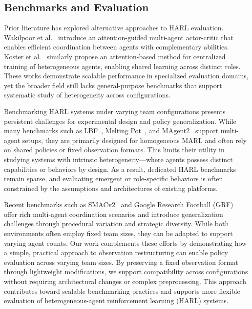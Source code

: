 \documentclass{article}
\begin{document}
\subsection{Benchmarks and Evaluation}

Prior literature has explored alternative approaches to HARL evaluation. 
Wakilpoor et al.~\cite{wakilpoor2020} introduce an attention-guided multi-agent actor-critic 
that enables efficient coordination between agents with complementary abilities. 
Koster et al.~\cite{koster2020} similarly propose an attention-based method for centralized 
training of heterogeneous agents, enabling shared learning across distinct roles. 
These works demonstrate scalable performance in specialized evaluation domains, 
yet the broader field still lacks general-purpose benchmarks that support systematic 
study of heterogeneity across configurations.

Benchmarking HARL systems under varying team configurations presents persistent
challenges for experimental design and policy generalization. While many benchmarks 
such as LBF~\cite{papoudakis2021}, Melting Pot~\cite{leibo2021}, and MAgent2~\cite{zheng2017} 
support multi-agent setups, they are primarily designed for homogeneous MARL 
and often rely on shared policies or fixed observation formats. This limits 
their utility in studying systems with intrinsic heterogeneity—where agents possess 
distinct capabilities or behaviors by design. As a result, dedicated HARL benchmarks 
remain sparse, and evaluating emergent or role-specific behaviors is often constrained 
by the assumptions and architectures of existing platforms.

Recent benchmarks such as SMACv2~\cite{ellis2023} and Google Research Football 
(GRF)~\cite{kurach2020} offer rich multi-agent coordination scenarios and introduce 
generalization challenges through procedural variation and strategic diversity. While both 
environments often employ fixed team sizes, they can be adapted to support varying agent counts.
Our work complements these efforts by demonstrating how a simple, practical approach to 
observation restructuring can enable policy evaluation across varying team sizes. By 
preserving a fixed observation format through lightweight modifications, we support compatibility 
across configurations without requiring architectural changes or complex preprocessing.
This approach contributes toward scalable benchmarking practices and supports 
more flexible evaluation of heterogeneous-agent reinforcement learning (HARL) systems.
\end{document}
